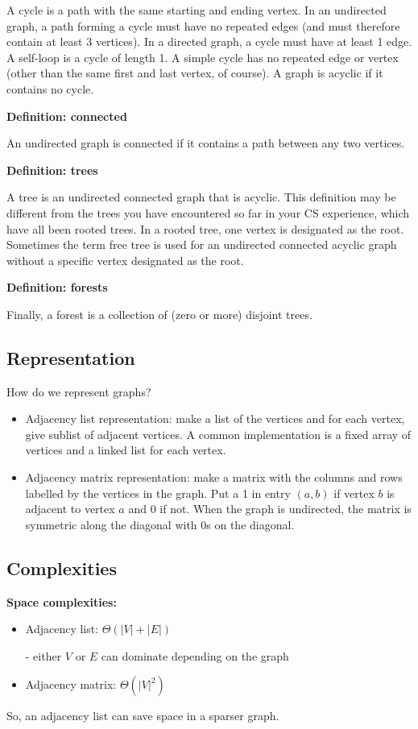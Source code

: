 \documentclass[11pt]{article}
\begin{document}
A cycle is a path with the same starting and ending vertex. In an undirected graph, a path forming a cycle must have no repeated edges (and must therefore contain at least 3 vertices). In a directed graph, a cycle must have at least 1 edge. A self-loop is a cycle of length 1. A simple cycle has no repeated edge or vertex (other than the same first and last vertex, of course). A graph is acyclic if it contains no cycle.

\textbf{Definition: connected}

An undirected graph is connected if it contains a path between any two vertices. 

\textbf{Definition: trees}

A tree is an undirected connected graph that is acyclic. This definition may be different from the trees you have encountered so far in your CS experience, which have all been rooted trees. In a rooted tree, one vertex is designated as the root. Sometimes the term free tree is used for an undirected connected acyclic graph without a specific vertex designated as the root.

\textbf{Definition: forests}

Finally, a forest is a collection of (zero or more) disjoint trees.



\subsection{Representation}
How do we represent graphs?
\begin{itemize}
    \item Adjacency list representation: make a list of the vertices and for each vertex, give sublist of adjacent vertices. A common implementation is a fixed array of vertices and a linked list for each vertex. 
    \item Adjacency matrix representation: make a matrix with the columns and rows labelled by the vertices in the graph. Put a 1 in entry $(a,b)$ if vertex $b$ is adjacent to vertex $a$ and 0 if not. When the graph is undirected, the matrix is symmetric along the diagonal with 0s on the diagonal. 
\end{itemize}

\subsection{Complexities}

\textbf{Space complexities:} 
\begin{itemize}
    \item Adjacency list: $\Theta(|V| + |E|)$ 
    
    - either $V$ or $E$ can dominate depending on the graph 
    \item Adjacency matrix: $\Theta(|V|^2)$
\end{itemize}
So, an adjacency list can save space in a sparser graph. 
\end{document}
